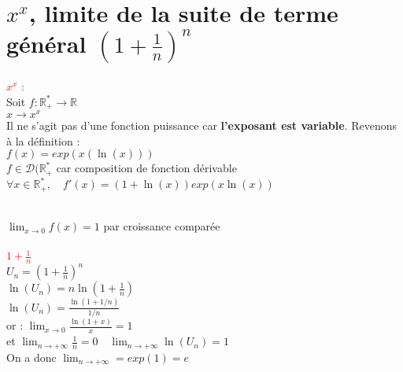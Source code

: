 \documentclass{article}
\begin{document}
	\section{$x^x$, limite de la suite de terme général $(1+\frac{1}{n})^n$}
	\textcolor{red}{$x^x$ :} \\	
	Soit $f : \mathbb{R}^*_+ \rightarrow \mathbb{R}$ \\
	\indent $x \rightarrow x^x$ \\
	Il ne s'agit pas d'une fonction puissance car {\bf l'exposant est variable}.
	Revenons à la définition : \\
	\indent $f(x)=exp(x(\ln(x)))$ \\
	$f \in \mathcal{D}(\mathbb{R^*_+}$ car composition de fonction dérivable \\
	$\forall x \in \mathbb{R}^*_+,\quad f'(x)=(1+\ln(x))exp(x\ln(x))$ \\
\\
$\lim_{x \rightarrow 0} f(x)=1$ par croissance comparée \\ \\
\textcolor{red}{$1+\frac{1}{n}$} \\
$U_n=(1+\frac{1}{n})^n$ \\
$\ln(U_n)=n \ln(1 + \frac{1}{n})$ \\
$\ln(U_n)=\frac{\ln(1+1/n)}{1/n}$ \\
or : $\lim_{x \rightarrow 0} \frac{\ln(1+x)}{x}=1$ \\
et $\lim_{n \rightarrow + \infty} \frac{1}{n}=0 \quad \lim_{n \rightarrow +\infty} \ln(U_n)=1$ \\
On a donc $ \lim_{n \rightarrow + \infty}=exp(1)=e$ 
\end{document}
